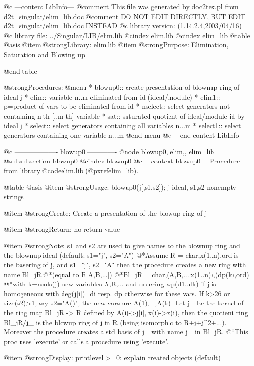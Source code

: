 @c ---content LibInfo---
@comment This file was generated by doc2tex.pl from d2t_singular/elim_lib.doc
@comment DO NOT EDIT DIRECTLY, BUT EDIT d2t_singular/elim_lib.doc INSTEAD
@c library version: (1.14.2.4,2003/04/16)
@c library file: ../Singular/LIB/elim.lib
@cindex elim.lib
@cindex elim_lib
@table @asis
@item @strong{Library:}
elim.lib
@item @strong{Purpose:}
      Elimination, Saturation and Blowing up

@end table

@strong{Procedures:}
@menu
* blowup0:: create presentation of blownup ring of ideal j
* elim:: variable n..m eliminated from id (ideal/module)
* elim1:: p=product of vars to be eliminated from id
* nselect:: select generators not containing n-th [..m-th] variable
* sat:: saturated quotient of ideal/module id by ideal j
* select:: select generators containing all variables n...m
* select1:: select generators containing one variable n...m
@end menu
@c ---end content LibInfo---

@c ------------------- blowup0 -------------
@node blowup0, elim,, elim_lib
@subsubsection blowup0
@cindex blowup0
@c ---content blowup0---
Procedure from library @code{elim.lib} (@pxref{elim_lib}).

@table @asis
@item @strong{Usage:}
blowup0(j[,s1,s2]); j ideal, s1,s2 nonempty strings

@item @strong{Create:}
Create a presentation of the blowup ring of j

@item @strong{Return:}
no return value

@item @strong{Note:}
s1 and s2 are used to give names to the blownup ring and the blownup
ideal (default: s1="j", s2="A")
@*Assume R = char,x(1..n),ord is the basering of j, and s1="j", s2="A"
then the procedure creates a new ring with name Bl_jR
@*(equal to R[A,B,...])
@*Bl_jR = char,(A,B,...,x(1..n)),(dp(k),ord)
@*with k=ncols(j) new variables A,B,... and ordering wp(d1..dk) if j is
homogeneous with deg(j[i])=di resp. dp otherwise for these vars.
If k>26 or size(s2)>1, say s2="A()", the new vars are A(1),...,A(k).
Let j_ be the kernel of the ring map Bl_jR -> R defined by A(i)->j[i],
x(i)->x(i), then the quotient ring Bl_jR/j_ is the blowup ring of j
in R (being isomorphic to R+j+j^2+...). Moreover the procedure creates
a std basis of j_ with name j_ in Bl_jR.
@*This proc uses 'execute' or calls a procedure using 'execute'.

@item @strong{Display:}
printlevel >=0: explain created objects (default)

